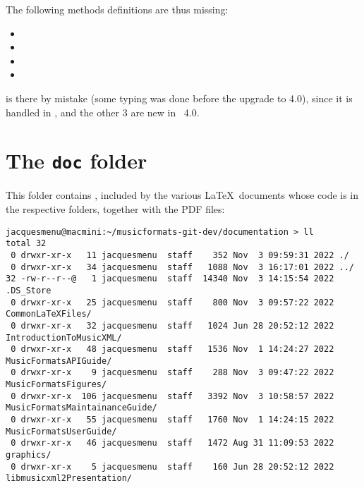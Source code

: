 The following methods definitions are thus missing:
\begin{itemize}
\item  {}
\item  {}
 \item {}
\item  {}
\end{itemize}

 is there by mistake (some typing was done before the upgrade to 4.0), since it is handled in , and the other 3 are new in \mxml\ 4.0.



\section{The {\tt doc} folder}

This folder contains , included by the various \LaTeX\ documents whose code is in the respective folders, together with the PDF files:
\begin{lstlisting}[language=Terminal]
jacquesmenu@macmini:~/musicformats-git-dev/documentation > ll
total 32
 0 drwxr-xr-x   11 jacquesmenu  staff    352 Nov  3 09:59:31 2022 ./
 0 drwxr-xr-x   34 jacquesmenu  staff   1088 Nov  3 16:17:01 2022 ../
32 -rw-r--r--@   1 jacquesmenu  staff  14340 Nov  3 14:15:54 2022 .DS_Store
 0 drwxr-xr-x   25 jacquesmenu  staff    800 Nov  3 09:57:22 2022 CommonLaTeXFiles/
 0 drwxr-xr-x   32 jacquesmenu  staff   1024 Jun 28 20:52:12 2022 IntroductionToMusicXML/
 0 drwxr-xr-x   48 jacquesmenu  staff   1536 Nov  1 14:24:27 2022 MusicFormatsAPIGuide/
 0 drwxr-xr-x    9 jacquesmenu  staff    288 Nov  3 09:47:22 2022 MusicFormatsFigures/
 0 drwxr-xr-x  106 jacquesmenu  staff   3392 Nov  3 10:58:57 2022 MusicFormatsMaintainanceGuide/
 0 drwxr-xr-x   55 jacquesmenu  staff   1760 Nov  1 14:24:15 2022 MusicFormatsUserGuide/
 0 drwxr-xr-x   46 jacquesmenu  staff   1472 Aug 31 11:09:53 2022 graphics/
 0 drwxr-xr-x    5 jacquesmenu  staff    160 Jun 28 20:52:12 2022 libmusicxml2Presentation/
\end{lstlisting}

